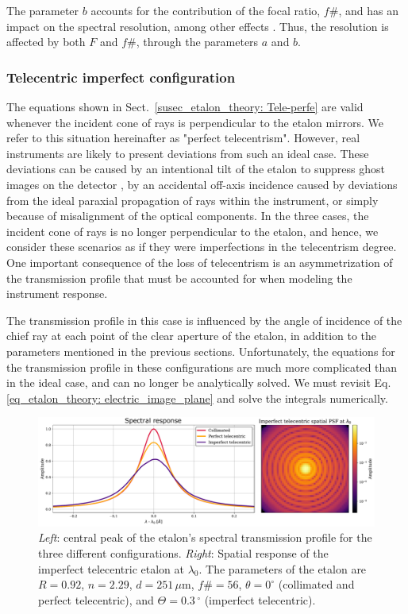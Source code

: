 The parameter $b$ accounts for the contribution of the focal ratio, $f\#$, and has an impact on the spectral resolution, among other effects \citep{beckers}. Thus, the resolution is affected by both $F$ and $f\#$, through the parameters $a$ and $b$.

\subsubsection{\label{etalon_theory: Tele-imperfe}Telecentric imperfect configuration}
The equations shown in Sect.~\ref{susec_etalon_theory: Tele-perfe} are valid whenever the incident cone of rays is perpendicular to the etalon mirrors. We refer to this situation hereinafter as "perfect telecentrism". However, real instruments are likely to present deviations from such an ideal case. These deviations can be caused by an intentional tilt of the etalon to suppress ghost images on the detector \citep{ghosts-etalon}, by an accidental off-axis incidence caused by deviations from the ideal paraxial propagation of rays within the instrument, or simply because of misalignment of the optical components. In the three cases, the incident cone of rays is no longer perpendicular to the etalon, and hence, we consider these scenarios as if they were imperfections in the telecentrism degree. One important consequence of the loss of telecentrism is an asymmetrization of the transmission profile that must be accounted for when modeling the instrument response.

The transmission profile in this case is influenced by the angle of incidence of the chief ray at each point of the clear aperture of the etalon, in addition to the parameters mentioned in the previous sections. Unfortunately, the equations for the transmission profile in these configurations are much more complicated than in the ideal case, and can no longer be analytically solved. We must revisit Eq. \eqref{eq_etalon_theory: electric_image_plane} and solve the integrals numerically.

\begin{figure}
    \centering
    \includegraphics[width = \textwidth]{figures/EtalonChallenges/etalon_setups_profiles.pdf}
    \caption[Etalon's spectral and spatial PSFs.]{\textit{Left}: central peak of the etalon's spectral transmission profile for the three different configurations. \textit{Right}: Spatial response of the imperfect telecentric etalon at $\lambda _ 0$. The parameters of the etalon are $R = 0.92$, $n = 2.29$, $d = 251 \, \mu \mathrm{m}$, $f\#=56$, $\theta = 0 ^{\circ}$ (collimated and perfect telecentric), and $\Theta = 0.3\,^{\circ}$ (imperfect telecentric).}
    \label{fig_etalon_theory:Profiles-configs}
\end{figure}


